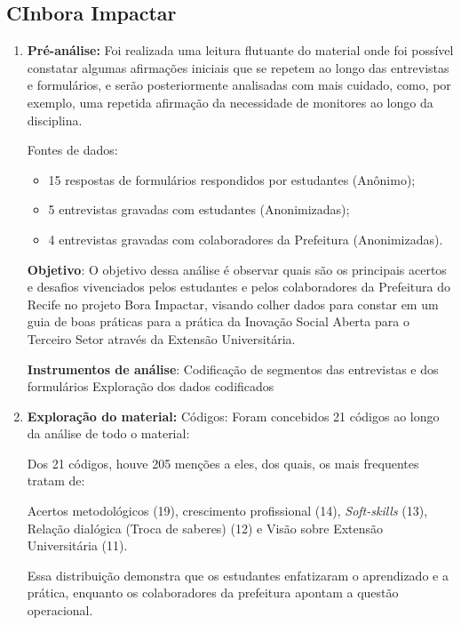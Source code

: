 \subsection{CInbora Impactar}
\label{analisecinbora}

\begin{enumerate}
    \item \textbf{Pré-análise: }
    Foi realizada uma leitura flutuante do material onde foi possível constatar algumas afirmações iniciais que se repetem ao longo das entrevistas e formulários, e serão posteriormente analisadas com mais cuidado, como, por exemplo, uma repetida afirmação da necessidade de monitores ao longo da disciplina.

    Fontes de dados:
    \begin{itemize}
        \item 15 respostas de formulários respondidos por estudantes (Anônimo);
\item 5 entrevistas gravadas com estudantes (Anonimizadas);
\item 4 entrevistas gravadas com colaboradores da Prefeitura (Anonimizadas).
    \end{itemize}


\textbf{Objetivo}:
O objetivo dessa análise é observar quais são os principais acertos e desafios vivenciados pelos estudantes e pelos colaboradores da Prefeitura do Recife no projeto Bora Impactar, visando colher dados para constar em um guia de boas práticas para a prática da Inovação Social Aberta para o Terceiro Setor através da Extensão Universitária.

\textbf{Instrumentos de análise}:
Codificação de segmentos das entrevistas e dos formulários
Exploração dos dados codificados  


 \item \textbf{Exploração do material: }
Códigos:
Foram concebidos 21 códigos ao longo da análise de todo o material: 


Dos 21 códigos, houve 205 menções a eles, dos quais, os mais frequentes tratam de:

Acertos metodológicos (19), crescimento profissional (14), \textit{Soft-skills} (13), Relação dialógica (Troca de saberes) (12) e Visão sobre Extensão Universitária (11).



Essa distribuição demonstra que os estudantes enfatizaram o aprendizado e a prática, enquanto os colaboradores da prefeitura apontam a questão operacional.


\end{enumerate}
